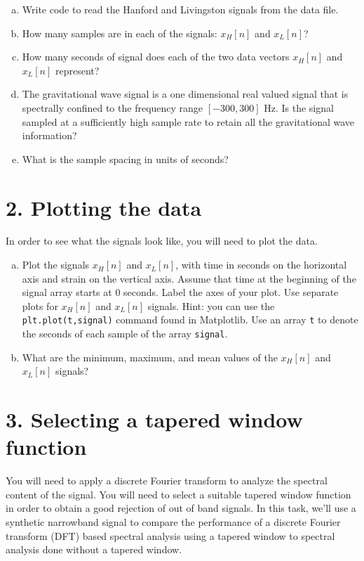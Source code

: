 \begin{enumerate}[a)]

\item Write code to read the Hanford and Livingston signals from the data file.
  
\item How many samples are in each of the signals: $x_H[n]$ and $x_L[n]$?
  
\item How many seconds of signal does each of the two data vectors $x_H[n]$ and $x_L[n]$ represent?
  
\item The gravitational wave signal is a one dimensional real valued
  signal that is spectrally confined to the frequency range $[-300,
    300]$ Hz. Is the signal sampled at a sufficiently high sample rate
  to retain all the gravitational wave information?
  
\item What is the sample spacing in units of seconds?
\end{enumerate}

\section{2. Plotting the data}

In order to see what the signals look like, you will need to plot the data.
\begin{enumerate}[a)]
\item Plot the signals $x_H[n]$ and $x_L[n]$, with time in seconds on
  the horizontal axis and strain on the vertical axis. Assume that
  time at the beginning of the signal array starts at $0$ seconds. Label
  the axes of your plot. Use separate plots for $x_H[n]$ and $x_L[n]$
  signals. Hint: you can use the \verb|plt.plot(t,signal)| command found in Matplotlib. Use an array \verb|t| to denote the seconds of each sample of the array \verb|signal|.
  
\item What are the minimum, maximum, and mean values of the $x_H[n]$ and $x_L[n]$ signals?
  
\end{enumerate}

\section{3. Selecting a tapered window function}

You will need to apply a discrete Fourier transform to analyze the
spectral content of the signal. You will need to select a suitable
tapered window function in order to obtain a good rejection of out of
band signals. In this task, we'll use a synthetic narrowband signal to
compare the performance of a discrete Fourier transform (DFT) based spectral
analysis using a tapered window to spectral analysis done without a
tapered window.

